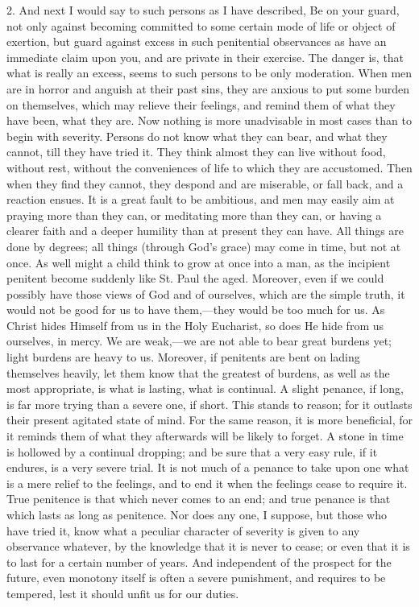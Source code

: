 2. And next I would say to such persons as I have described, Be on
your guard, not only against becoming committed to some certain mode
of life or object of exertion, but guard against excess in such
penitential observances as have an immediate claim upon you, and are
private in their exercise. The danger is, that what is really an
excess, seems to such persons to be only moderation. When men are in
horror and anguish at their past sins, they are anxious to put some
burden on themselves, which may relieve their feelings, and remind
them of what they have been, what they are. Now nothing is more
unadvisable in most cases than to begin with severity. Persons do not
know what they can bear, and what they cannot, till they have tried
it. They think almost they can live without food, without rest,
without the conveniences of life to which they are accustomed. Then
when they find they cannot, they despond and are miserable, or fall
back, and a reaction ensues. It is a great fault to be ambitious, and
men may easily aim at praying more than they can, or meditating more
than they can, or having a clearer faith and a deeper humility than at
present they can have. All things are done by degrees; all things
(through God's grace) may come in time, but not at once. As well might
a child think to grow at once into a man, as the incipient penitent
become suddenly like St. Paul the aged. Moreover, even if we could
possibly have those views of God and of ourselves, which are the
simple truth, it would not be good for us to have them,—they would
be too much for us. As Christ hides Himself from us in the Holy
Eucharist, so does He hide from us ourselves, in mercy. We are weak,—we
are not able to bear great burdens yet; light burdens are heavy to us.
Moreover, if penitents are bent on lading themselves heavily, let them
know that the greatest of burdens, as well as the most appropriate, is
what is lasting, what is continual. A slight penance, if long, is far
more trying than a severe one, if short. This stands to reason; for it
outlasts their present agitated state of mind. For the same reason, it
is more beneficial, for it reminds them of what they afterwards will
be likely to forget. A stone in time is hollowed by a continual
dropping; and be sure that a very easy rule, if it endures, is a very
severe trial. It is not much of a penance to take upon one what is a
mere relief to the feelings, and to end it when the feelings cease to
require it. True penitence is that which never comes to an end; and
true penance is that which lasts as long as penitence. Nor does any
one, I suppose, but those who have tried it, know what a peculiar
character of severity is given to any observance whatever, by the
knowledge that it is never to cease; or even that it is to last for a
certain number of years. And independent of the prospect for the
future, even monotony itself is often a severe punishment, and
requires to be tempered, lest it should unfit us for our duties.

